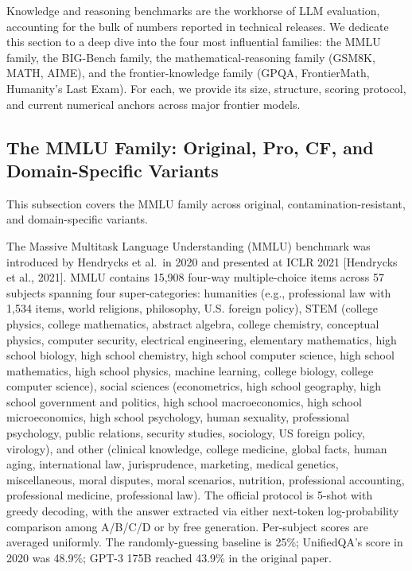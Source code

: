 Knowledge and reasoning benchmarks are the workhorse of LLM evaluation, accounting for the bulk of numbers reported in technical releases. We dedicate this section to a deep dive into the four most influential families: the MMLU family, the BIG-Bench family, the mathematical-reasoning family (GSM8K, MATH, AIME), and the frontier-knowledge family (GPQA, FrontierMath, Humanity's Last Exam). For each, we provide its size, structure, scoring protocol, and current numerical anchors across major frontier models.

\subsection{The MMLU Family: Original, Pro, CF, and Domain-Specific Variants}\label{the-mmlu-family-original-pro-cf-and-domain-specific-variants}

This subsection covers the MMLU family across original, contamination-resistant, and domain-specific variants.

The Massive Multitask Language Understanding (MMLU) benchmark was introduced by Hendrycks et al.~in 2020 and presented at ICLR 2021 {[}Hendrycks et al., 2021{]}. MMLU contains 15,908 four-way multiple-choice items across 57 subjects spanning four super-categories: humanities (e.g., professional law with 1,534 items, world religions, philosophy, U.S. foreign policy), STEM (college physics, college mathematics, abstract algebra, college chemistry, conceptual physics, computer security, electrical engineering, elementary mathematics, high school biology, high school chemistry, high school computer science, high school mathematics, high school physics, machine learning, college biology, college computer science), social sciences (econometrics, high school geography, high school government and politics, high school macroeconomics, high school microeconomics, high school psychology, human sexuality, professional psychology, public relations, security studies, sociology, US foreign policy, virology), and other (clinical knowledge, college medicine, global facts, human aging, international law, jurisprudence, marketing, medical genetics, miscellaneous, moral disputes, moral scenarios, nutrition, professional accounting, professional medicine, professional law). The official protocol is 5-shot with greedy decoding, with the answer extracted via either next-token log-probability comparison among A/B/C/D or by free generation. Per-subject scores are averaged uniformly. The randomly-guessing baseline is 25\%; UnifiedQA's score in 2020 was 48.9\%; GPT-3 175B reached 43.9\% in the original paper.

